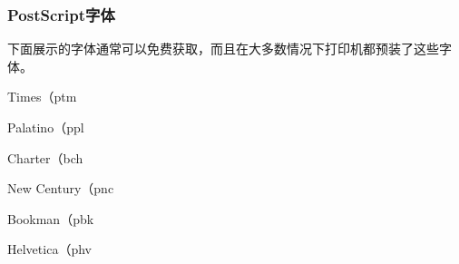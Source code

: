 \subsubsection{PostScript字体}

下面展示的字体通常可以免费获取，而且在大多数情况下打印机都预装了这些字体。

\begin{decritfonte}{Times（}{ptm}
  \end{decritfonte}
  
  \begin{decritfonte}{Palatino（}{ppl}
  \end{decritfonte}
  
  \begin{decritfonte}{Charter（}{bch}
  \end{decritfonte}
  
  \begin{decritfonte}{New Century（}{pnc}
  \end{decritfonte}
  
  \begin{decritfonte}{Bookman（}{pbk}
  \end{decritfonte}

  \begin{decritfonte}{Helvetica（}{phv}
  \end{decritfonte}
  
